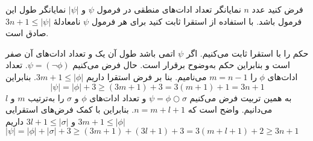 فرض کنید عدد $n$ نمایانگر تعداد ادات‌های منطقی در فرمول $\psi$ و $|\psi|$ نمایانگر طول این فرمول باشد. با استفاده از استقرا ثابت کنید برای هر فرمول $\psi$ نامعادلهٔ
$3n+1\leq|\psi|$ صادق است.
\begin{ans}
حکم را با استقرا ثابت می‌کنیم. اگر $\psi$ اتمی باشد طول آن یک و تعداد ادات‌های آن صفر است و بنابراین حکم به‌وضوح برقرار است. حال فرض می‌کنیم
$\psi=(\neg\phi)$.
تعداد ادات‌های $\phi$ را $m=n-1$ می‌نامیم. بنا بر فرض استقرا داریم
$3m+1\leq|\phi|$.
بنابراین
$$
|\psi|=|\phi|+3\geq(3m+1)+3=3(m+1)+1=3n+1
$$
به همین تربیت فرض می‌کنیم
$\psi=\phi\bigcirc\sigma$
و تعداد ادات‌های $\phi$ و $\sigma$ را به‌ترتیب $m$ و $l$ می‌دانیم. واضح است که $n=m+l+1$. بنابراین با کمک فرض‌های استقرایی
$3m+1\leq|\phi|$
و
$3l+1\leq|\sigma|$
داریم
$|\psi|=|\phi|+|\sigma|+3\geq(3m+1)+(3l+1)+3=3(m+l+1)+2\geq3n+1$
\end{ans}
